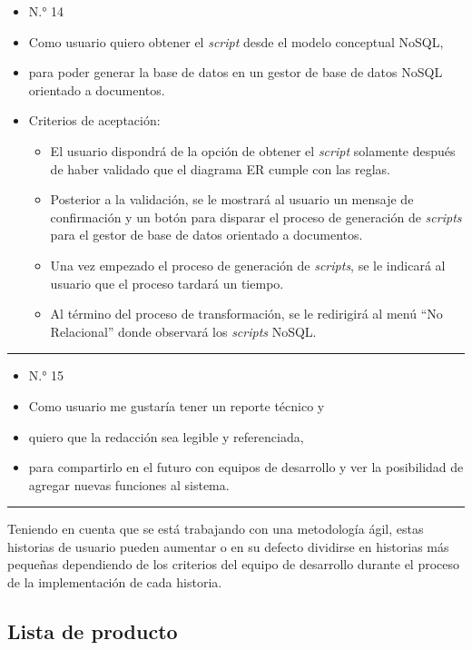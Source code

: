 \begin{itemize}
	\item N.° 14
	\item Como usuario quiero obtener el \textit{script} desde el modelo conceptual NoSQL,
	\item para poder generar la base de datos en un gestor de base de datos NoSQL orientado a documentos.
	\item Criterios de aceptación:
	\begin{itemize}
		\item El usuario dispondrá de la opción de obtener el \textit{script} solamente después de haber validado que el diagrama ER cumple con las reglas.
		\item Posterior a la validación, se le mostrará al usuario un mensaje de confirmación y un botón para disparar el proceso de generación de \textit{scripts} para el gestor de base de datos orientado a documentos.
		\item Una vez empezado el proceso de generación de \textit{scripts}, se le indicará al usuario que el proceso tardará un tiempo.
		\item Al término del proceso de transformación, se le redirigirá al menú ``No Relacional'' donde observará los \textit{scripts} NoSQL.
	\end{itemize}
\end{itemize}

\noindent\rule{\textwidth}{1pt}
\begin{itemize}
	\item N.° 15
	\item Como usuario me gustaría tener un reporte técnico y
	\item quiero que la redacción sea legible y referenciada,
	\item para compartirlo en el futuro con equipos de desarrollo y ver la posibilidad de agregar nuevas funciones al sistema.
\end{itemize}
\noindent\rule{\textwidth}{1pt}




Teniendo en cuenta que se está trabajando con una metodología ágil, estas historias de usuario pueden aumentar o en su defecto dividirse en historias más pequeñas dependiendo de los criterios del equipo de desarrollo durante el proceso de la implementación de cada historia.




\subsection{Lista de producto}

